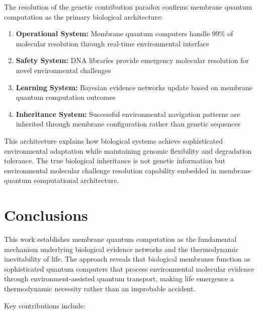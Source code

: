 \documentclass[12pt,a4paper]{article}
\begin{document}
The resolution of the genetic contribution paradox confirms membrane quantum computation as the primary biological architecture:

\begin{enumerate}
\item \textbf{Operational System:} Membrane quantum computers handle 99\% of molecular resolution through real-time environmental interface
\item \textbf{Safety System:} DNA libraries provide emergency molecular resolution for novel environmental challenges
\item \textbf{Learning System:} Bayesian evidence networks update based on membrane quantum computation outcomes
\item \textbf{Inheritance System:} Successful environmental navigation patterns are inherited through membrane configuration rather than genetic sequences
\end{enumerate}

This architecture explains how biological systems achieve sophisticated environmental adaptation while maintaining genomic flexibility and degradation tolerance. The true biological inheritance is not genetic information but environmental molecular challenge resolution capability embedded in membrane quantum computational architecture.

\section{Conclusions}

This work establishes membrane quantum computation as the fundamental mechanism underlying biological evidence networks and the thermodynamic inevitability of life. The approach reveals that biological membranes function as sophisticated quantum computers that process environmental molecular evidence through environment-assisted quantum transport, making life emergence a thermodynamic necessity rather than an improbable accident.

Key contributions include:
\end{document}
